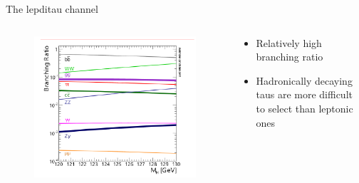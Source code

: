 \begin{frame}{The \tHq lepditau channel}
  \begin{columns}
    \begin{column}{0.5\textwidth}
      \begin{figure}
        \centering
        \includegraphics[width=\textwidth]{higgsBranching.PNG}
        \caption{\cite{PhysRevD.98.030001}}
      \end{figure}
    \end{column}
    \begin{column}{0.5\textwidth}
      \begin{itemize}
        \item Relatively high branching ratio
        \vspace{0.3cm}
        \item Hadronically decaying taus are more difficult to select than leptonic ones
      \end{itemize}
    \end{column}
  \end{columns}
\end{frame}


